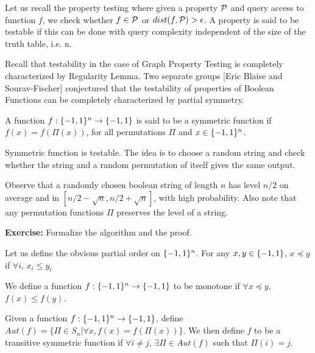 \begin{note}[Testability]
    Let us recall the property testing where given a property $\mathcal{P}$ and query access to function $f$, we check whether $f \in \mathcal{P}$ or $dist(f,\mathcal{P}) > \epsilon$. A property is said to be testable if this can be done with query complexity independent of the size of the truth table, i.e. n.
\end{note}

\begin{idea}
    Recall that testability in the case of Graph Property Testing is completely characterized by Regularity Lemma. Two separate groups [Eric Blaise and Sourav-Fischer] conjectured that the testability of properties of Boolean Functions can be completely characterized by partial symmetry.
\end{idea}

\begin{definition}
    A function ${f} : {\{-1,1\}^n} \rightarrow {\{-1,1\}}$ is said to be a symmetric function if $f(x) = f(\Pi(x))$, for all permutations $\Pi$ and $x \in \{-1,1\}^n$.
\end{definition}

\begin{note}
    Symmetric function is testable. The idea is to choose a random string and check whether the string and a random permutation of itself gives the same output.
    
    Observe that a randomly chosen boolean string of length $n$ has level $n/2$ on average and in $[n/2-\sqrt{n},n/2+\sqrt{n}]$, with high probability. Also note that any permutation functions $\Pi$ preserves the level of a string.

    \textbf{Exercise: } Formalize the algorithm and the proof.
\end{note}

Let us define the obvious partial order on $\{-1,1\}^n$. For any $x,y \in \{-1,1\}$, $x \preceq y$ if $\forall i$, $x_i \leq y_i$

\begin{definition}
    We define a function ${f} : {\{-1,1\}^n} \rightarrow {\{-1,1\}}$ to be monotone if $\forall x \preceq y$, $f(x) \leq f(y)$.
\end{definition}

\begin{definition}
    Given a function ${f} : {\{-1,1\}^n} \rightarrow {\{-1,1\}}$, define $Aut(f) = \{\Pi \in S_n| \forall x, f(x) = f(\Pi(x))\}$. We then define $f$ to be a transitive symmetric function if $\forall i \neq j$, $\exists \Pi \in Aut(f)$ such that $\Pi(i) = j$.
\end{definition}


